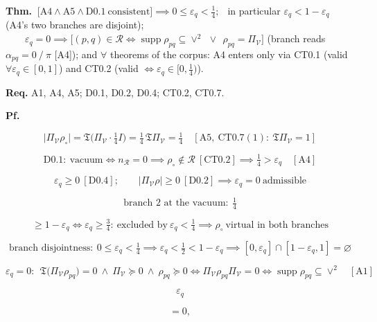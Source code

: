 \begin{theorem}\label{tag:CT0-8}
\textbf{Thm.} $\ \bigl[\mathrm{A4}\wedge\mathrm{A5}\wedge\mathrm{D0.1}\ \text{consistent}\bigr]\implies 0\le\varepsilon_q<\tfrac14;$ $\ \ $in particular $\varepsilon_q<1-\varepsilon_q$ (A4's two branches are disjoint); $\qquad\varepsilon_q=0\implies\bigl[(p,q)\in\mathcal R\iff\operatorname{supp}\rho_{pq}\subseteq\vee^2\ \ \vee\ \ \rho_{pq}=\Pi_{\mathcal V}\bigr]$ (branch reads $\alpha_{pq}=0\ /\ \pi$ [A4]); and $\forall$ theorems of the corpus: A4 enters only via CT0.1 (valid $\forall\varepsilon_q\in[0,1]$) and CT0.2 (valid $\iff\varepsilon_q\in[0,\tfrac14)$).

\textbf{Req.} A1, A4, A5; D0.1, D0.2, D0.4; CT0.2, CT0.7.

\textbf{Pf.}

\[
\bigl|\Pi_{\mathcal V}\rho_\circ\bigr|=\mathfrak T\bigl(\Pi_{\mathcal V}\cdot\tfrac14 I\bigr)=\tfrac14\,\mathfrak T\Pi_{\mathcal V}=\tfrac14\quad[\mathrm{A5},\ \mathrm{CT0.7}(1):\ \mathfrak T\Pi_{\mathcal V}=1]
\]

\[
\mathrm{D0.1}:\ \text{vacuum}\iff n_{\mathcal R}=0\implies\rho_\circ\notin\mathcal R\ [\mathrm{CT0.2}]\implies\tfrac14>\varepsilon_q\quad[\mathrm{A4}]
\]

\[
\varepsilon_q\ge0\ [\mathrm{D0.4}];\qquad\bigl|\Pi_{\mathcal V}\rho\bigr|\ge0\ [\mathrm{D0.2}]\implies\varepsilon_q=0\ \text{admissible}
\]

\[
\text{branch 2 at the vacuum}:\ \tfrac14
\]

\[
\ge 1-\varepsilon_q\iff\varepsilon_q\ge\tfrac34:\ \text{excluded by}\ \varepsilon_q<\tfrac14\implies\rho_\circ\ \text{virtual in both branches}
\]

\[
\text{branch disjointness}:\ 0\le\varepsilon_q<\tfrac14\implies\varepsilon_q<\tfrac12<1-\varepsilon_q\implies[0,\varepsilon_q]\cap[1-\varepsilon_q,1]=\varnothing
\]

\[
\varepsilon_q=0:\ \ \mathfrak T\bigl(\Pi_{\mathcal V}\rho_{pq}\bigr)=0\ \wedge\ \Pi_{\mathcal V}\succeq0\ \wedge\ \rho_{pq}\succeq0\iff\Pi_{\mathcal V}\rho_{pq}\Pi_{\mathcal V}=0\iff\operatorname{supp}\rho_{pq}\subseteq\vee^2\quad[\mathrm{A1}]
\]

\[
\varepsilon_q
\]

\[
= 0,
\]


\end{theorem}
